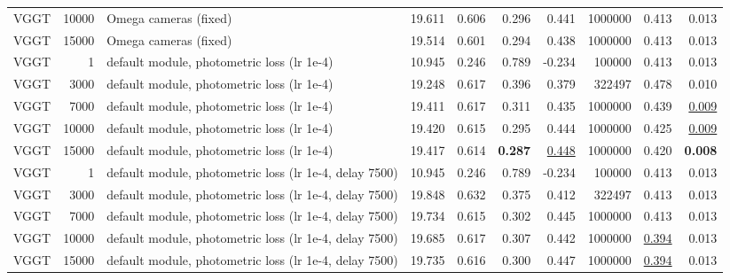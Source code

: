 \begin{table}[H]
\begin{tabular}{lrlrrrrrrr}
VGGT & 10000 & Omega cameras (fixed) & 19.611 & 0.606 & 0.296 & 0.441 & 1000000 & 0.413 & 0.013 \\
VGGT & 15000 & Omega cameras (fixed) & 19.514 & 0.601 & 0.294 & 0.438 & 1000000 & 0.413 & 0.013 \\
VGGT & 1 & default module, photometric loss (lr 1e-4) & 10.945 & 0.246 & 0.789 & -0.234 & 100000 & 0.413 & 0.013 \\
VGGT & 3000 & default module, photometric loss (lr 1e-4) & 19.248 & 0.617 & 0.396 & 0.379 & 322497 & 0.478 & 0.010 \\
VGGT & 7000 & default module, photometric loss (lr 1e-4) & 19.411 & 0.617 & 0.311 & 0.435 & 1000000 & 0.439 & \underline{0.009} \\
VGGT & 10000 & default module, photometric loss (lr 1e-4) & 19.420 & 0.615 & 0.295 & 0.444 & 1000000 & 0.425 & \underline{0.009} \\
VGGT & 15000 & default module, photometric loss (lr 1e-4) & 19.417 & 0.614 & \textbf{0.287} & \underline{0.448} & 1000000 & 0.420 & \textbf{0.008} \\
VGGT & 1 & default module, photometric loss (lr 1e-4, delay 7500) & 10.945 & 0.246 & 0.789 & -0.234 & 100000 & 0.413 & 0.013 \\
VGGT & 3000 & default module, photometric loss (lr 1e-4, delay 7500) & 19.848 & 0.632 & 0.375 & 0.412 & 322497 & 0.413 & 0.013 \\
VGGT & 7000 & default module, photometric loss (lr 1e-4, delay 7500) & 19.734 & 0.615 & 0.302 & 0.445 & 1000000 & 0.413 & 0.013 \\
VGGT & 10000 & default module, photometric loss (lr 1e-4, delay 7500) & 19.685 & 0.617 & 0.307 & 0.442 & 1000000 & \underline{0.394} & 0.013 \\
VGGT & 15000 & default module, photometric loss (lr 1e-4, delay 7500) & 19.735 & 0.616 & 0.300 & 0.447 & 1000000 & \underline{0.394} & 0.013 \\
\bottomrule
\end{tabular}
\end{table}